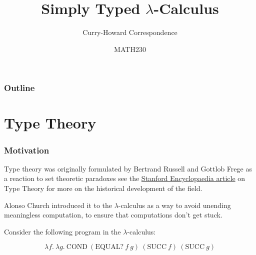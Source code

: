 \documentclass{beamer}
\title{Simply Typed $\lambda$-Calculus}
\subtitle{Curry-Howard Correspondence}
\author{MATH230}
\institute{Te Kura P\=angarau \\ Te Whare W\=ananga o Waitaha}
\date{}
\theoremstyle{indentDefn} \newtheorem{defn}[]{Definition}
\begin{document}
\begin{frame}

  \titlepage

\end{frame}

\begin{frame}
  \frametitle{Outline}

  \tableofcontents

\end{frame}

\section{Type Theory}

\begin{frame}
  \frametitle{Motivation}

  	Type theory was originally formulated by Bertrand Russell and Gottlob Frege as a reaction to set theoretic paradoxes see the \href{https://plato.stanford.edu/entries/type-theory/}{Stanford Encyclopaedia article} on Type Theory for more on the historical development of the field. 
    
    Alonso Church introduced it to the $\lambda$-calculus as a way to avoid unending meaningless computation, to ensure that computations don't get stuck. 



    Consider the following program in the $\lambda$-calculus:


    $$\lambda f. \ \lambda g. \ \text{COND} \ (\text{EQUAL?} \ f \ g) \ (\text{SUCC} \ f) \ (\text{SUCC} \ g) $$

    \vspace{2cm}

\end{frame}
\end{document}
